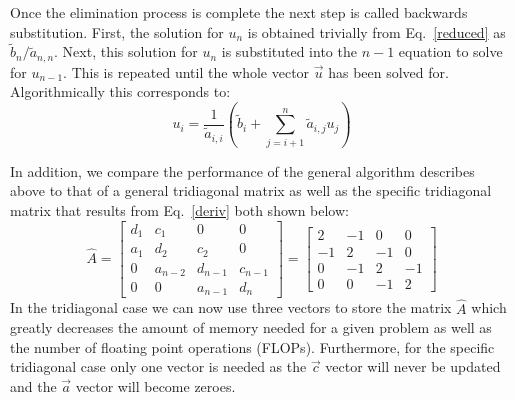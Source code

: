 \documentclass[prc,amsmath,twocolumn,superscriptaddress]{revtex4}
\begin{document}
Once the elimination process is complete the next step is called backwards substitution. First, the solution for $u_n$ is obtained trivially from Eq.~\ref{reduced} as $\tilde{b}_n/\tilde{a}_{n,n}$. Next, this solution for $u_n$ is substituted into the $n-1$ equation to solve for $u_{n-1}$. This is repeated until the whole vector $\vec{u}$ has been solved for. Algorithmically this corresponds to:
\begin{equation}
u_i=\frac{1}{\tilde{a}_{i,i}}\left(\tilde{b}_i + \sum_{j=i+1}^n \tilde{a}_{i,j}u_j \right)
\end{equation}

In addition, we compare the performance of the general algorithm describes above to that of a general tridiagonal matrix as well as the specific tridiagonal matrix that results from Eq.~\ref{deriv} both shown below:
\begin{equation}
\hat{A}=\begin{bmatrix} d_{1} & c_{1} &0&0\\ a_{1}  & d_{2} &c_{2}&0 \\ 0  & a_{n-2}  &d_{n-1}&c_{n-1} \\ 0  &0& a_{n-1}  &d_{n} \end{bmatrix}=
\begin{bmatrix} 2 & -1&0&0\\ -1  & 2 &-1&0 \\ 0  & -1  &2&-1 \\ 0  &0& -1  &2 \end{bmatrix}
\end{equation}
\indent In the tridiagonal case we can now use three vectors to store the matrix $\hat{A}$ which greatly decreases the amount of memory needed for a given problem as well as the number of floating point operations (FLOPs). Furthermore, for the specific tridiagonal case only one vector is needed as the $\vec{c}$ vector will never be updated and the $\vec{a}$ vector will become zeroes. \\
\end{document}
